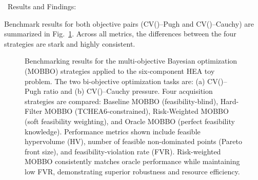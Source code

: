 \documentclass[letterpaper,4pt,times,preprint]{elsarticle}
\begin{document}
\vspace{8pt}
\noindent\ Results and Findings:

Benchmark results for both objective pairs (CV()--Pugh and CV()--Cauchy) are summarized in Fig.~\ref{fig:benchmark_results}. Across all metrics, the differences between the four strategies are stark and highly consistent.

\begin{figure}[htbp]
    \centering
    
    \caption{Benchmarking results for the multi-objective Bayesian optimization (MOBBO) strategies applied to the six-component HEA toy problem. 
    The two bi-objective optimization tasks are: (a) CV()--Pugh ratio and (b) CV()--Cauchy pressure. 
    Four acquisition strategies are compared: Baseline MOBBO (feasibility-blind), Hard-Filter MOBBO (TCHEA6-constrained), Risk-Weighted MOBBO (soft feasibility weighting), and Oracle MOBBO (perfect feasibility knowledge). 
    Performance metrics shown include feasible hypervolume (HV), number of feasible non-dominated points (Pareto front size), and feasibility-violation rate (FVR). 
    Risk-weighted MOBBO consistently matches oracle performance while maintaining low FVR, demonstrating superior robustness and resource efficiency.}
    \label{fig:benchmark_results}
\end{figure}
\end{document}
